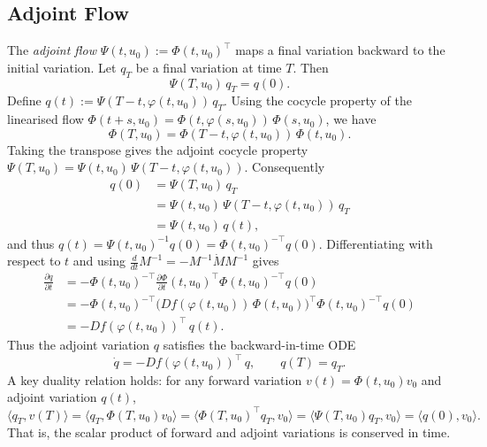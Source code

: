 \documentclass[11pt,a4paper]{article}
\begin{document}
\subsection{Adjoint Flow}
The \emph{adjoint flow} $\Psi(t, u_0) := \Phi(t, u_0)^\top$ maps a final
variation backward to the initial variation.  Let $q_T$ be a final variation
at time $T$.  Then
\begin{equation*}
    \Psi(T, u_0)\,q_T = q(0).
\end{equation*}
Define $q(t) := \Psi(T - t, \varphi(t, u_0))\,q_T$.
Using the cocycle property of the linearised flow
$\Phi(t+s, u_0) = \Phi(t, \varphi(s, u_0))\,\Phi(s, u_0)$,
we have
\begin{equation*}
    \Phi(T, u_0) = \Phi(T - t, \varphi(t, u_0))\,\Phi(t, u_0).
\end{equation*}
Taking the transpose gives the adjoint cocycle property
$\Psi(T, u_0) = \Psi(t, u_0)\,\Psi(T - t, \varphi(t, u_0))$.
Consequently
\begin{align*}
    q(0) &= \Psi(T, u_0)\,q_T \\
         &= \Psi(t, u_0)\,\Psi(T - t, \varphi(t, u_0))\,q_T \\
         &= \Psi(t, u_0)\,q(t),
\end{align*}
and thus $q(t) = \Psi(t, u_0)^{-1}q(0) = \Phi(t, u_0)^{-\top}q(0)$.
Differentiating with respect to $t$ and using
$\frac{d}{dt}M^{-1} = -M^{-1}\dot{M}M^{-1}$ gives
\begin{align*}
    \frac{\partial q}{\partial t}
    &= -\Phi(t, u_0)^{-\top}
       \frac{\partial \Phi}{\partial t}(t, u_0)^{\top}
       \Phi(t, u_0)^{-\top} q(0) \\
    &= -\Phi(t, u_0)^{-\top}
       \bigl(Df(\varphi(t, u_0))\,\Phi(t, u_0)\bigr)^{\top}
       \Phi(t, u_0)^{-\top} q(0) \\
    &= -Df(\varphi(t, u_0))^{\top}\,q(t).
\end{align*}
Thus the adjoint variation $q$ satisfies the backward-in-time ODE
\begin{equation}\label{eq:adjoint_flow}
  \dot{q} = -Df(\varphi(t, u_0))^\top\,q, \qquad q(T) = q_T.
\end{equation}
A key duality relation holds: for any forward variation
$v(t) = \Phi(t, u_0) v_0$ and adjoint variation $q(t)$,
\begin{equation}\label{eq:duality}
  \langle q_T, v(T) \rangle
  = \langle q_T, \Phi(T, u_0) v_0 \rangle
  = \langle \Phi(T, u_0)^\top q_T, v_0 \rangle
  = \langle \Psi(T, u_0) q_T, v_0 \rangle
  = \langle q(0), v_0 \rangle.
\end{equation}
That is, the scalar product of forward and adjoint variations is conserved
in time.
\end{document}

